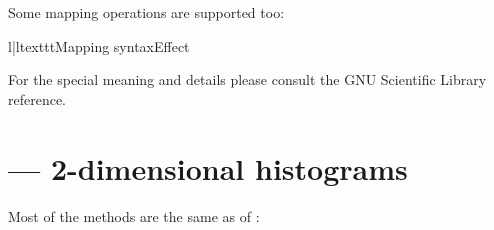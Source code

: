 Some mapping operations are supported too:\nopagebreak
\begin{tableii}{l|l}{texttt}{Mapping syntax}{Effect}
\end{tableii}

\begin{seealso}
For the special meaning and details please consult the GNU Scientific Library
reference.
\end{seealso}


\section{\protect{} --- 2-dimensional histograms}

Most of the methods are the same as of :

\newcommand{\methodhistogramddindex}[1]{\refhistogramindex{histogram2d}{#1}}

